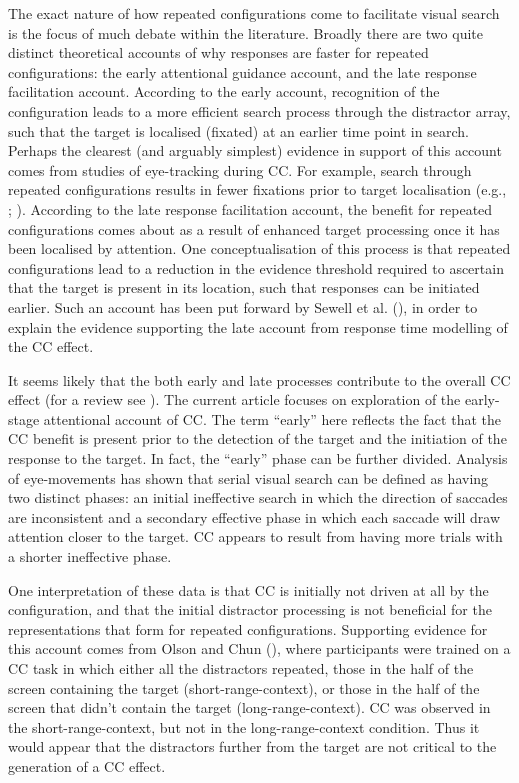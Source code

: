 \documentclass[
  man,
  floatsintext,
  longtable,
  nolmodern,
  notxfonts,
  notimes,
  colorlinks=true,linkcolor=blue,citecolor=blue,urlcolor=blue]{apa7}
\begin{document}
The exact nature of how repeated configurations come to facilitate
visual search is the focus of much debate within the literature. Broadly
there are two quite distinct theoretical accounts of why responses are
faster for repeated configurations: the early attentional guidance
account, and the late response facilitation account. According to the
early account, recognition of the configuration leads to a more
efficient search process through the distractor array, such that the
target is localised (fixated) at an earlier time point in search.
Perhaps the clearest (and arguably simplest) evidence in support of this
account comes from studies of eye-tracking during CC. For example,
search through repeated configurations results in fewer fixations prior
to target localisation (e.g., ; ). According to the
late response facilitation account, the benefit for repeated
configurations comes about as a result of enhanced target processing
once it has been localised by attention. One conceptualisation of this
process is that repeated configurations lead to a reduction in the
evidence threshold required to ascertain that the target is present in
its location, such that responses can be initiated earlier. Such an
account has been put forward by Sewell et al.
(), in order to explain the evidence
supporting the late account from response time modelling of the CC
effect.

It seems likely that the both early and late processes contribute to the
overall CC effect (for a review see ). The current article focuses on exploration of the early-stage
attentional account of CC. The term ``early'' here reflects the fact
that the CC benefit is present prior to the detection of the target and
the initiation of the response to the target. In fact, the ``early''
phase can be further divided. Analysis of eye-movements has shown that
serial visual search can be defined as having two distinct phases: an
initial ineffective search in which the direction of saccades are
inconsistent and a secondary effective phase in which each saccade will
draw attention closer to the target. CC appears to result from having
more trials with a shorter ineffective phase.

One interpretation of these data is that CC is initially not driven at
all by the configuration, and that the initial distractor processing is
not beneficial for the representations that form for repeated
configurations. Supporting evidence for this account comes from Olson
and Chun (), where participants were
trained on a CC task in which either all the distractors repeated, those
in the half of the screen containing the target (short-range-context),
or those in the half of the screen that didn't contain the target
(long-range-context). CC was observed in the short-range-context, but
not in the long-range-context condition. Thus it would appear that the
distractors further from the target are not critical to the generation
of a CC effect.
\end{document}
